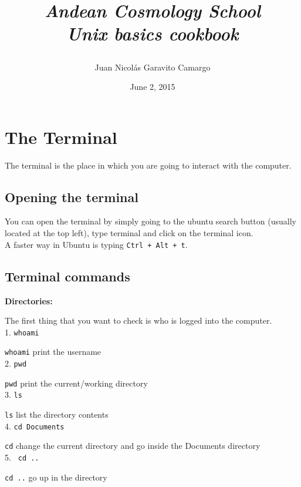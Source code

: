 \documentclass[12pt]{article}
\title{\begin{LARGE}{ \textsl{Andean Cosmology School \\
Unix basics cookbook}}
\end{LARGE}}
\author{Juan Nicol\'as Garavito Camargo}
\begin{document}
\date{June 2, 2015}

\maketitle

\section{The Terminal}

The terminal is the place in which you are going to 
interact with the computer. 

\subsection{Opening the terminal}

You can open the terminal by simply going 
to the ubuntu search button (usually located
at the top left), type terminal and click 
on the terminal icon. \\

A faster way in Ubuntu is typing \verb"Ctrl + Alt + t".

\subsection{Terminal commands}

\textbf{Directories:}

The first thing that you want to check 
is who is logged into the computer.\\

1. \verb+whoami+

{\color{blue} \verb+whoami+ print the username}\\



2. \verb+pwd+  

{\color{blue} \verb+pwd+ print the current/working directory}\\

3. \verb+ls+

{\color{blue} \verb+ls+ list the directory contents}\\

4. \verb+cd Documents+

{\color{blue} \verb+cd+ change the current directory and go inside the Documents
directory}\\

5. \verb+ cd ..+ 

{\color{blue} \verb+cd ..+ go up in the directory}\\
\end{document}
